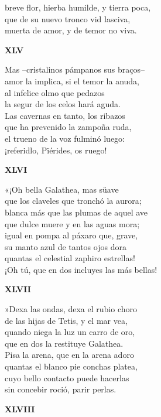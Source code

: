 \documentclass[11pt,twoside]{article}
\begin{document}
breve flor, hierba humilde, y tierra poca,\\
que de su nuevo tronco vid lasciva,\\
muerta de amor, y de temor no viva.\par\poend
\repage
%
\begin{center}
	\textbf{XLV}
\end{center}\postart
Mas --cristalinos pámpanos sus braços--\\
amor la implica, si el temor la anuda,\\
al infelice olmo que pedazos\\
la segur de los celos hará aguda.\\
Las cavernas en tanto, los ribazos\\
que ha prevenido la zampoña ruda,\\
el trueno de la voz fulminó luego:\\
¡referidlo, Pïérides, os ruego!\par\poend
%
\begin{center}
	\textbf{XLVI}
\end{center}\postart
«¡Oh bella Galathea, mas süave\\
que los claveles que tronchó la aurora;\\
blanca más que las plumas de aquel ave\\
que dulce muere y en las aguas mora;\\
igual en pompa al páxaro que, grave,\\
su manto azul de tantos ojos dora\\
quantas el celestial zaphiro estrellas!\\
¡Oh tú, que en dos incluyes las más bellas!\par\poend
%
\begin{center}
	\textbf{XLVII}
\end{center}\postart
»Dexa las ondas, dexa el rubio choro\\
de las hijas de Tetis, y el mar vea,\\
quando niega la luz un carro de oro,\\
que en dos la restituye Galathea.\\
Pisa la arena, que en la arena adoro\\
quantas el blanco pie conchas platea,\\
cuyo bello contacto puede hacerlas\\
sin concebir roció, parir perlas.\par\poend
%
\begin{center}
	\textbf{XLVIII}
\end{center}\postart
\end{document}
